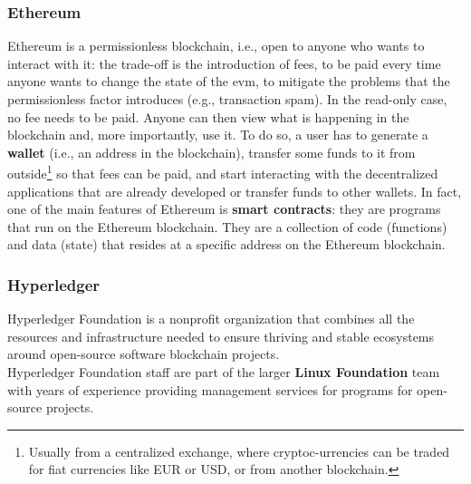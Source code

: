 \subsubsection{Ethereum}
Ethereum\cite{site:ethereum} is a permissionless blockchain, i.e., open to anyone who wants to interact 
with it: the trade-off is the introduction of fees, to be paid every time anyone wants 
to change the state of the \acrfull{evm}, to mitigate the problems 
that the permissionless factor introduces (e.g., transaction spam). In the read-only 
case, no fee needs to be paid. Anyone can then view what is happening in the blockchain 
and, more importantly, use it. To do so, a user has to generate a \textbf{wallet} (i.e.,
an address in the blockchain), transfer some funds to it from outside\footnote{Usually
from a centralized exchange, where cryptoc-urrencies can be traded for fiat currencies
like EUR or USD, or from another blockchain.} so that fees can be paid, and start 
interacting with the decentralized applications that are already developed or transfer 
funds to other wallets. In fact, one of the main features of Ethereum is \textbf{smart 
contracts}: they are programs that run on the Ethereum blockchain. They are a collection 
of code (functions) and data (state) that resides at a specific address on the 
Ethereum blockchain.
\subsubsection{Hyperledger}
Hyperledger Foundation\cite{site:hyperledger} is a nonprofit organization that combines all the resources and 
infrastructure needed to ensure thriving and stable ecosystems around open-source 
software blockchain projects.\\
Hyperledger Foundation staff are part of the larger \textbf{Linux Foundation} team with
years of experience providing management services for programs for open-source projects.

